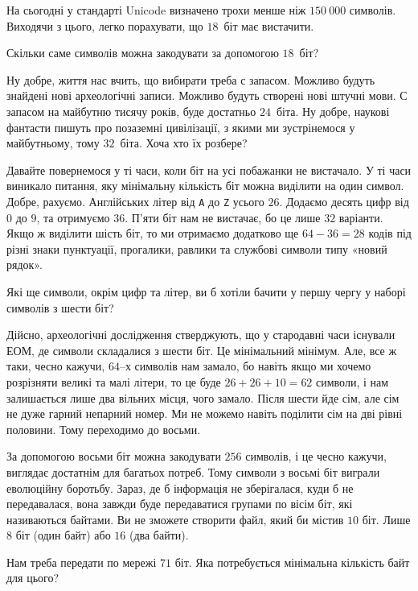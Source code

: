 \documentclass{book}
\newcommand{\bitstr}[1]{{\tt #1}}
\begin{document}
На сьогодні у стандарті Unicode визначено трохи менше ніж $150~000$ символів.
Виходячи з цього, легко порахувати, що $18$~біт має вистачити.

\begin{exercise}
Скільки саме символів можна закодувати за допомогою $18$~біт?
\end{exercise}

Ну добре, життя нас вчить, що вибирати треба с запасом.
Можливо будуть знайдені нові археологічні записи.
Можливо будуть створені нові штучні мови.
С запасом на майбутню тисячу років, буде достатньо $24$~біта.
Ну добре, наукові фантасти пишуть про позаземні цивілізації, з якими ми зустрінемося у майбутньому, тому $32$~біта.
Хоча хто їх розбере?

Давайте повернемося у ті часи, коли біт на усі побажанки не вистачало.
У ті часи виникало питання, яку мінімальну кількість біт можна виділити на один символ.
Добре, рахуємо.
Англійських літер від \bitstr{A} до \bitstr{Z} усього $26$.
Додаємо десять цифр від $0$ до $9$, та отримуємо $36$.
П'яти біт нам не вистачає, бо це лише $32$ варіанти.
Якщо ж виділити шість біт, то ми отримаємо додатково ще $64-36=28$ кодів під різні знаки пунктуації, прогалики, равлики та службові символи типу «новий рядок».

\begin{exercise}
Які ще символи, окрім цифр та літер, ви б хотіли бачити у першу чергу у наборі символів з шести біт?
\end{exercise}

Дійсно, археологічні дослідження стверджують, що у стародавні часи існували ЕОМ, де символи складалися з шести біт.
Це мінімальний мінімум.
Але, все ж таки, чесно кажучи, $64$--х символів нам замало, бо навіть якщо ми хочемо розрізняти великі та малі літери, то це буде $26+26+10=62$ символи, і нам залишається лише два вільних місця, чого замало.
Після шести йде сім, але сім не дуже гарний непарний номер.
Ми не можемо навіть поділити сім на дві рівні половини.
Тому переходимо до восьми.

За допомогою восьми біт можна закодувати $256$ символів, і це чесно кажучи, виглядає достатнім для багатьох потреб.
Тому символи з восьмі біт виграли еволюційну боротьбу.
Зараз, де б інформація не зберігалася, куди б не передавалася, вона завжди буде передаватися групами по вісім біт, які називаються байтами.
Ви не зможете створити файл, який би містив $10$ біт. Лише $8$ біт (один байт) або $16$ (два байти).

\begin{exercise}
Нам треба передати по мережі $71$ біт. Яка потребується мінімальна кількість байт для цього?
\end{exercise}
\end{document}
